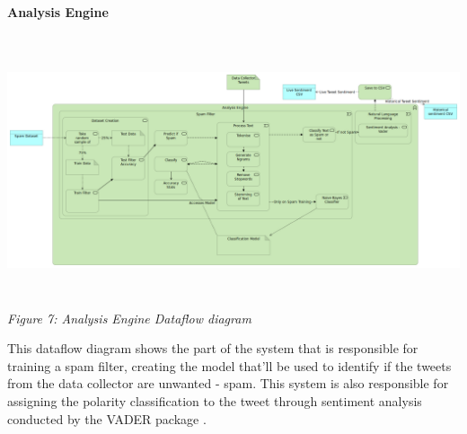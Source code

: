 \documentclass[oneside, 12pt]{article}
\begin{document}
		\textbf{Analysis Engine}
		\begin{center}
			\includegraphics[width=17cm,height=8cm]{images/Analysis_Engine.png}
			\textit{Figure 7: Analysis Engine Dataflow diagram}
		\end{center}
		This dataflow diagram shows the part of the system that is responsible for training a spam filter, creating the model that'll be used to identify if the tweets from the data collector are unwanted - spam. This system is also responsible for assigning the polarity classification to the tweet through sentiment analysis conducted by the VADER package \cite{VADERPaper}.
\end{document}

